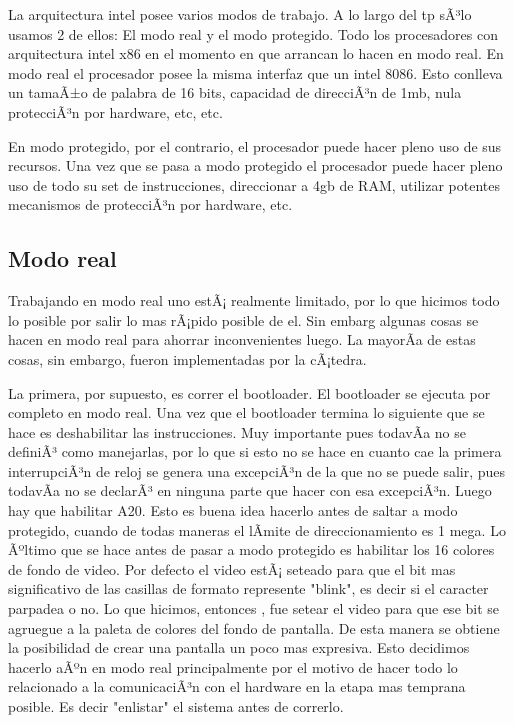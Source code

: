 La arquitectura intel posee varios modos de trabajo. A lo largo
del tp sÃ³lo usamos 2 de ellos: El modo real y el modo protegido. Todo
los procesadores con arquitectura intel x86 en el momento en que arrancan lo
hacen en modo real. En modo real el procesador posee la misma interfaz
que un intel 8086. Esto conlleva un tamaÃ±o de palabra de 16 bits,
capacidad de direcciÃ³n de 1mb, nula protecciÃ³n por hardware, etc, etc.

	En modo protegido, por el contrario, el procesador puede hacer pleno
uso de sus recursos. Una vez que se pasa a modo protegido el procesador
puede hacer pleno uso de todo su set de instrucciones, direccionar a 4gb de RAM,
utilizar potentes mecanismos de protecciÃ³n por hardware, etc.

\subsection{Modo real}

	Trabajando en modo real uno estÃ¡ realmente limitado, por lo que
hicimos todo lo posible por salir lo mas rÃ¡pido posible de el. Sin embarg
algunas cosas se hacen en modo real para ahorrar inconvenientes luego. La
mayorÃ­a de estas cosas, sin embargo, fueron implementadas por la cÃ¡tedra.

	La primera, por supuesto, es correr el bootloader. El bootloader se
ejecuta por completo en modo real. Una vez que el bootloader termina lo siguiente
que se hace es deshabilitar las instrucciones. Muy importante pues todavÃ­a
no se definiÃ³ como manejarlas, por lo que si esto no se hace
en cuanto cae la primera interrupciÃ³n de reloj se genera una excepciÃ³n de
la que no se puede salir, pues todavÃ­a no se declarÃ³ en ninguna parte
que hacer con esa excepciÃ³n. Luego hay que habilitar A20. Esto 
es buena idea hacerlo antes de saltar a modo protegido, cuando de todas
maneras el lÃ­mite de direccionamiento es 1 mega. Lo Ãºltimo que se hace antes de pasar
a modo protegido es habilitar los 16 colores de fondo de video. Por defecto
el video estÃ¡ seteado para que el bit mas significativo de las casillas de formato
represente "blink", es decir si el caracter parpadea o no. Lo que hicimos, entonces
, fue setear el video para que ese bit se agruegue a la paleta de colores del fondo
de pantalla. De esta manera se obtiene la posibilidad de crear una pantalla
un poco mas expresiva. Esto decidimos hacerlo aÃºn en modo real principalmente
por el motivo de hacer todo lo relacionado a la comunicaciÃ³n con el hardware
en la etapa mas temprana posible. Es decir "enlistar" el sistema antes de
correrlo.

